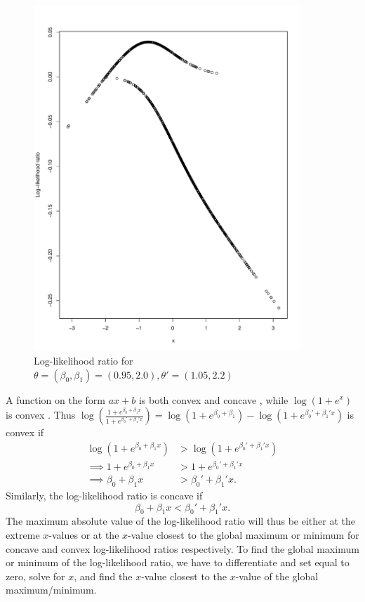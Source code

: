 \begin{figure}
    \centering
    \includegraphics[scale = 0.7, height = 13cm]{figures/loglik_ratio_logist2.pdf}
    \caption{Log-likelihood ratio for $\theta = \left(\beta_0, \beta_1\right) = \left(0.95, 2.0\right), \theta' = \left(1.05, 2.2\right)$}
    \label{fig:loglik_ratio_logistic2}
\end{figure}{
A function on the form $ax + b$ is both convex and concave , while $\log\left(1 + e^x\right)$ is convex . 
Thus $\log\left(\frac{1 + e^{\beta_0 + \beta_1 x}}{1 + e^{\beta_0' + \beta_1'x}}\right) = \log\left(1 + e^{\beta_0 + \beta_1}\right) - \log\left(1+ e^{ \beta_0' + \beta_1'x}\right)$ is convex if 
\begin{equation*}
\begin{split}
    \log\left(1 + e^{\beta_0 + \beta_1x}\right) &> \log\left(1 + e^{\beta_0' + \beta_1' x}\right)  \\
    \implies 1 + e^{\beta_0 + \beta_1x} &> 1 + e^{\beta_0' + \beta_1'x} \\
    \implies \beta_0 + \beta_1 x &> \beta_0' + \beta_1'x.
\end{split}{}
\end{equation*}
Similarly, the log-likelihood ratio is concave if 
\begin{equation*}
    \beta_0 + \beta_1 x < \beta_0' + \beta_1'x. 
\end{equation*}
The maximum absolute value of the log-likelihood ratio will thus be either at the extreme $x$-values or at the $x$-value closest to the global maximum or minimum for concave and convex log-likelihood ratios respectively.  To find the global maximum or minimum of the log-likelihood ratio, we have to differentiate and set equal to zero, solve for $x$, and find the $x$-value closest to the $x$-value of the global maximum/minimum. 
}
